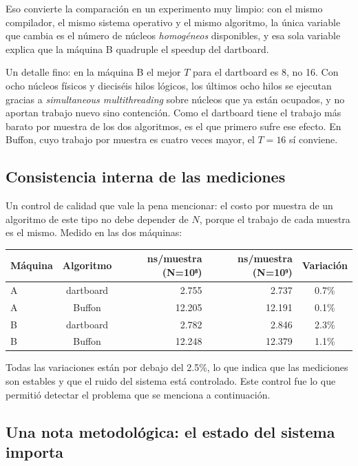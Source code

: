 Eso convierte la comparación en un experimento muy limpio: con el mismo compilador, el mismo sistema operativo y el mismo algoritmo, la única variable que cambia es el número de núcleos \emph{homogéneos} disponibles, y esa sola variable explica que la máquina B quadruple el speedup del dartboard.

Un detalle fino: en la máquina B el mejor $T$ para el dartboard es 8, no 16. Con ocho núcleos físicos y dieciséis hilos lógicos, los últimos ocho hilos se ejecutan gracias a \emph{simultaneous multithreading} sobre núcleos que ya están ocupados, y no aportan trabajo nuevo sino contención. Como el dartboard tiene el trabajo más barato por muestra de los dos algoritmos, es el que primero sufre ese efecto. En Buffon, cuyo trabajo por muestra es cuatro veces mayor, el \(T=16\) sí conviene.

\subsection{Consistencia interna de las mediciones}

Un control de calidad que vale la pena mencionar: el costo por muestra de un algoritmo de este tipo no debe depender de \(N\), porque el trabajo de cada muestra es el mismo. Medido en las dos máquinas:

\begin{center}
\begin{tabular}{|l|c|r|r|c|}
\hline
\textbf{Máquina} & \textbf{Algoritmo} & \textbf{ns/muestra (N=10⁸)} & \textbf{ns/muestra (N=10⁹)} & \textbf{Variación} \\
\hline
A & dartboard & 2.755 & 2.737 & 0.7\% \\
A & Buffon & 12.205 & 12.191 & 0.1\% \\
B & dartboard & 2.782 & 2.846 & 2.3\% \\
B & Buffon & 12.248 & 12.379 & 1.1\% \\
\hline
\end{tabular}
\caption{Dispersión del costo por muestra entre dos tamaños de muestra.}
\label{tab:consistencia}
\end{center}

Todas las variaciones están por debajo del 2.5\%, lo que indica que las mediciones son estables y que el ruido del sistema está controlado. Este control fue lo que permitió detectar el problema que se menciona a continuación.

\subsection{Una nota metodológica: el estado del sistema importa}

